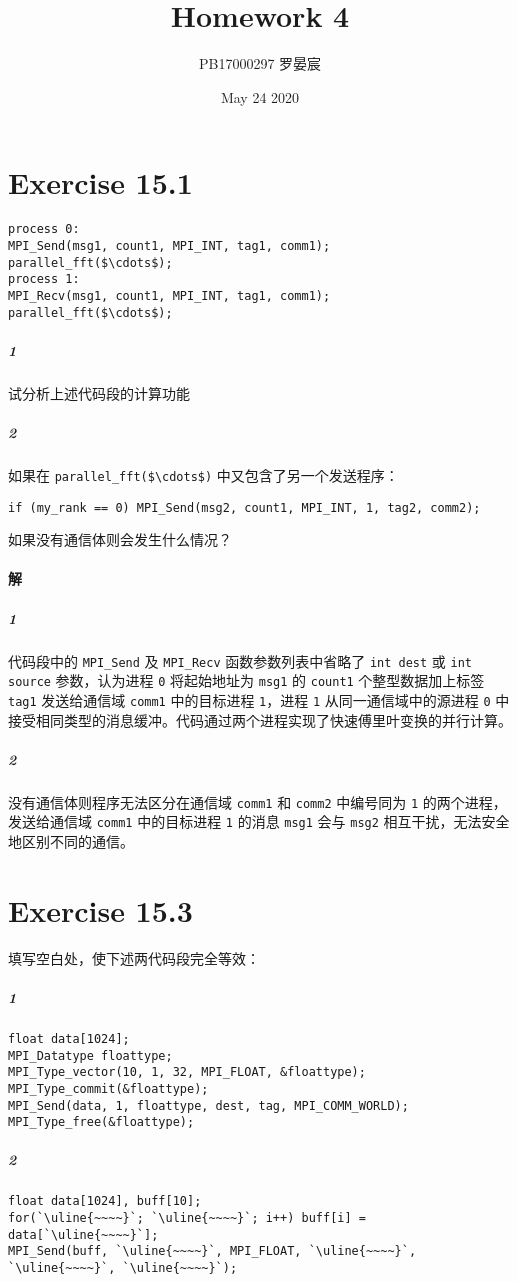\documentclass{article}
\title{Homework 4}
\author{PB17000297 罗晏宸}
\date{May 24 2020}
\begin{document}
\maketitle

\section{Exercise 15.1}
\begin{lstlisting}[xleftmargin = .1\textwidth, xrightmargin = .1\textwidth]
process 0:
MPI_Send(msg1, count1, MPI_INT, tag1, comm1);
parallel_fft($\cdots$);
process 1:
MPI_Recv(msg1, count1, MPI_INT, tag1, comm1);
parallel_fft($\cdots$);
\end{lstlisting}
\subparagraph{\textcircled{1}} 试分析上述代码段的计算功能
\subparagraph{\textcircled{2}} 如果在 \lstinline{parallel_fft($\cdots$)} 中又包含了另一个发送程序：
\begin{lstlisting}[xleftmargin = .1\textwidth, xrightmargin = .1\textwidth]
    if (my_rank == 0) MPI_Send(msg2, count1, MPI_INT, 1, tag2, comm2);
\end{lstlisting}

如果没有通信体则会发生什么情况？

\paragraph{解}
\subparagraph{\textcircled{1}}
代码段中的 \lstinline{MPI_Send} 及 \lstinline{MPI_Recv} 函数参数列表中省略了 \lstinline{int dest} 或 \lstinline{int source} 参数，认为进程 \lstinline{0} 将起始地址为 \lstinline{msg1} 的 \lstinline{count1} 个整型数据加上标签 \lstinline{tag1} 发送给通信域 \lstinline{comm1} 中的目标进程 \lstinline{1}，进程 \lstinline{1} 从同一通信域中的源进程 \lstinline{0} 中接受相同类型的消息缓冲。代码通过两个进程实现了快速傅里叶变换的并行计算。

\subparagraph{\textcircled{2}}
没有通信体则程序无法区分在通信域 \lstinline{comm1} 和 \lstinline{comm2} 中编号同为 \lstinline{1} 的两个进程，发送给通信域 \lstinline{comm1} 中的目标进程 \lstinline{1} 的消息 \lstinline{msg1} 会与 \lstinline{msg2} 相互干扰，无法安全地区别不同的通信。
\section{Exercise 15.3}
填写空白处，使下述两代码段完全等效：
\subparagraph{\textcircled{1}}
\begin{lstlisting}[xleftmargin = .1\textwidth, xrightmargin = .1\textwidth, ]
float data[1024];
MPI_Datatype floattype;
MPI_Type_vector(10, 1, 32, MPI_FLOAT, &floattype);
MPI_Type_commit(&floattype);
MPI_Send(data, 1, floattype, dest, tag, MPI_COMM_WORLD);
MPI_Type_free(&floattype);
\end{lstlisting}
\subparagraph{\textcircled{2}}
\begin{lstlisting}[xleftmargin = .1\textwidth, xrightmargin = .1\textwidth]
float data[1024], buff[10];
for(`\uline{~~~~}`; `\uline{~~~~}`; i++) buff[i] = data[`\uline{~~~~}`];
MPI_Send(buff, `\uline{~~~~}`, MPI_FLOAT, `\uline{~~~~}`, `\uline{~~~~}`, `\uline{~~~~}`);
\end{lstlisting}
\end{document}

